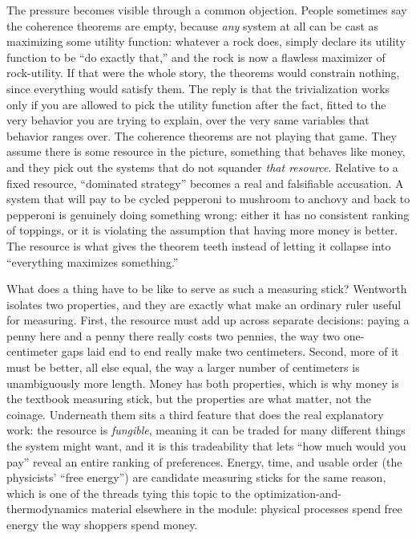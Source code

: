 \documentclass[10pt]{article}
\theoremstyle{definition}
\theoremstyle{remark}
\begin{document}
The pressure becomes visible through a common objection. People sometimes say the coherence theorems are empty, because \emph{any} system at all can be cast as maximizing some utility function: whatever a rock does, simply declare its utility function to be ``do exactly that,'' and the rock is now a flawless maximizer of rock-utility. If that were the whole story, the theorems would constrain nothing, since everything would satisfy them. The reply is that the trivialization works only if you are allowed to pick the utility function after the fact, fitted to the very behavior you are trying to explain, over the very same variables that behavior ranges over. The coherence theorems are not playing that game. They assume there is some resource in the picture, something that behaves like money, and they pick out the systems that do not squander \emph{that resource}. Relative to a fixed resource, ``dominated strategy'' becomes a real and falsifiable accusation. A system that will pay to be cycled pepperoni to mushroom to anchovy and back to pepperoni is genuinely doing something wrong: either it has no consistent ranking of toppings, or it is violating the assumption that having more money is better. The resource is what gives the theorem teeth instead of letting it collapse into ``everything maximizes something.''

What does a thing have to be like to serve as such a measuring stick? Wentworth isolates two properties, and they are exactly what make an ordinary ruler useful for measuring. First, the resource must add up across separate decisions: paying a penny here and a penny there really costs two pennies, the way two one-centimeter gaps laid end to end really make two centimeters. Second, more of it must be better, all else equal, the way a larger number of centimeters is unambiguously more length. Money has both properties, which is why money is the textbook measuring stick, but the properties are what matter, not the coinage. Underneath them sits a third feature that does the real explanatory work: the resource is \emph{fungible}, meaning it can be traded for many different things the system might want, and it is this tradeability that lets ``how much would you pay'' reveal an entire ranking of preferences. Energy, time, and usable order (the physicists' ``free energy'') are candidate measuring sticks for the same reason, which is one of the threads tying this topic to the optimization-and-thermodynamics material elsewhere in the module: physical processes spend free energy the way shoppers spend money.
\end{document}
